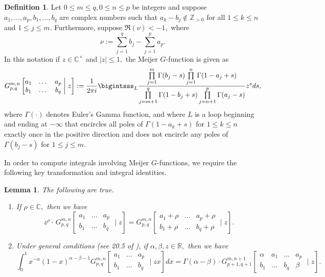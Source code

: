 \documentclass[12pt]{amsart}
\newtheorem{lemma}[theorem]{Lemma}
\theoremstyle{definition}
\newtheorem{definition}[theorem]{Definition}
\theoremstyle{remark}
\numberwithin{equation}{section}
\def\C{\mathbb C}
\def\Z{{\mathbb Z}}
\def \R {\mathcal R}
\def\C{\mathbb{C}}
\def\R{\mathbb{R}}
\def\Z{\mathbb{Z}}
\begin{document}
\begin{definition}\label{MeijerGDef}
    Let $0\leq m\leq q,0\leq n\leq p$ be integers and suppose $a_1,\ldots,a_p,b_1,\ldots,b_q$ are complex numbers such that $a_k-b_j\not\in\Z_{>0}$ for all $1\leq k\leq n$ and $1\leq j\leq m.$ Furthermore, suppose $\Re(\nu)<-1,$ where
    $$
    \nu:=\sum\limits_{j=1}^q b_j-\sum\limits_{j=1}^pa_p.
    $$
    In this notation if $z\in\C^\times$ and $|z|\leq 1,$ the Meijer $G$-function is given as
    $$
    G_{p,q}^{m,n} \left[\begin{matrix}a_1 & \ldots & a_p \\  b_1 & \ldots & b_q\end{matrix} \; \bigg| \; z \right]:=\frac{1}{2\pi i}\bigintsss_L \frac{\prod\limits_{j=1}^m\Gamma(b_j-s)\prod\limits_{j=1}^n\Gamma(1-a_j+s)}{\prod\limits_{j=m+1}^q\Gamma(1-b_j+s)\prod\limits_{j=n+1}^p\Gamma(a_j-s)}z^sds,
    $$
    where $\Gamma(\cdot)$ denotes Euler's Gamma function, and where $L$ is a loop beginning and ending at $-\infty$ that encircles all poles of $\Gamma(1-a_k+s)$ for $1\leq k\leq n$ exactly once in the positive direction and does not encircle any poles of $\Gamma(b_j-s)$ for $1\leq j\leq m.$
\end{definition}

In order to compute integrals involving Meijer $G$-functions, we require the following key transformation and integral identities.

\begin{lemma}\label{MeijerGProps}
    The following are true.
    \begin{enumerate}
    \item If $\rho\in \C,$ then we have
    $$
    z^{\rho} \cdot \, G_{p,q}^{m,n} \left[\begin{matrix} a_1 & \ldots & a_p \\  b_{1} & \ldots & b_q\end{matrix} \; \bigg| \; z \right] = G_{p,q}^{m,n}\left[\begin{matrix} a_1+\rho & \ldots & a_p+\rho \\  b_1+\rho & \ldots & b_q+\rho\end{matrix} \; \bigg| \; z \right].
    $$
    \item Under general conditions (see 20.5 of \cite{IntTransforms}), if $\alpha,\beta,z\in\R,$ then we have
    $$
    \int_{0}^{1} x^{-\alpha}(1-x)^{\alpha-\beta-1} G_{p,q}^{m,n} \left[\begin{matrix} a_1 & \ldots & a_p \\  b_1 & \ldots & b_q\end{matrix} \; \bigg| \; zx \right] dx = \Gamma(\alpha-\beta)\cdot G_{p+1,q+1}^{m,n+1} \left[\begin{matrix} \alpha & a_{1} & \ldots & a_p \\  b_{1} & \ldots & b_q & \beta\end{matrix} \; \bigg| \; z \right].
    $$

    \end{enumerate}
\end{lemma}
\end{document}

